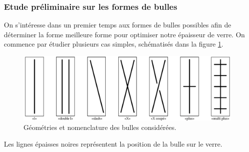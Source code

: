 \documentclass[11pt,titlepage]{article}
\begin{document}
\subsubsection{Etude préliminaire sur les formes de bulles}

On s'intéresse dans un premier temps aux formes de bulles possibles afin de déterminer la forme meilleure forme pour optimiser notre épaisseur de verre. On commence par étudier plusieurs cas simples, schématisés dans la figure \ref{fig:types_bulle}. 

\begin{figure}[H]
    \centering
    \includegraphics[width=\linewidth]{img/bulle/types_bulles.pdf}
    \caption{Géométries et nomenclature des bulles considérées.}
    \label{fig:types_bulle}
\end{figure}

Les lignes épaisses noires représentent la position de la bulle sur le verre. 
\end{document}

